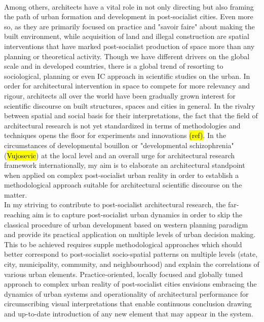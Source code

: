 \documentclass[11pt]{report}
\begin{document}
\\
Among others, architects have a vital role in not only directing but also framing the path of urban formation and development in post-socialist cities. Even more so, as they are primarily focused on practice and "savoir faire" about making the built environment, while acquisition of land and illegal construction are spatial interventions that have marked post-socialist production of space more than any planning or theoretical activity. Though we have different drivers on the global scale and in developed countries, there is a global trend of resorting to sociological, planning or even IC approach in scientific studies on the urban. 
In order for architectural intervention in space to compete for more relevancy and rigour,  architects all over the world have been gradually grown interest for scientific discourse on built structures, spaces and cities in general.  In the rivalry between spatial and social basis for their interpretations, the fact that the field of architectural research is not yet standardized in terms of methodologies and techniques opens the floor for experiments and innovations \hl{(ref)}. In the circumstances of developmental bouillon or "developmental schizophrenia"(\hl{Vujosevic}) at the local level and an overall urge for architectural research framework internationally, my aim is to elaborate an architectural standpoint when applied on complex post-socialist urban reality in order to establish a methodological approach suitable for architectural scientific discourse on the matter.
\\
In my striving to contribute to post-socialist architectural research, the far-reaching aim is to capture post-socialist urban dynamics  in order to skip the classical procedure of urban development based on western planning paradigm and provide its practical application on multiple levels of urban decision making. This to be achieved requires supple methodological approaches which should better correspond to post-socialist socio-spatial patterns on multiple levels (state, city, municipality, community, and neighbourhood) and explain the correlations of various urban elements. Practice-oriented, locally focused and globally tuned  approach to complex urban reality of post-socialist cities envisions embracing the dynamics of urban systems and operationality of architectural performance for circumscribing visual interpretations that enable continuous conclusion drawing and up-to-date introduction of any new element that may appear in the system.
\end{document}
